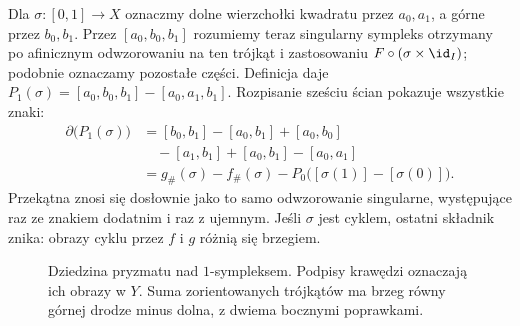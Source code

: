 \begin{przyklad}
\label{prz:pryzmat-drogi}
Dla $\sigma:[0,1]\to X$ oznaczmy dolne wierzchołki kwadratu
przez $a_0,a_1$, a górne przez $b_0,b_1$.
Przez $[a_0,b_0,b_1]$ rozumiemy teraz singularny sympleks
otrzymany po afinicznym odwzorowaniu na ten trójkąt i zastosowaniu
$F\circ(\sigma\times\id_I)$; podobnie oznaczamy pozostałe części.
Definicja daje $P_1(\sigma)=[a_0,b_0,b_1]-[a_0,a_1,b_1]$.
Rozpisanie sześciu ścian pokazuje wszystkie znaki:
\[
 \begin{aligned}
 \partial\bigl(P_1(\sigma)\bigr)
 &=[b_0,b_1]-[a_0,b_1]+[a_0,b_0]\\
 &\quad-[a_1,b_1]+[a_0,b_1]-[a_0,a_1]\\
 &=g_\#(\sigma)-f_\#(\sigma)
   -P_0\bigl([\sigma(1)]-[\sigma(0)]\bigr).
 \end{aligned}
\]
Przekątna znosi się dosłownie jako to samo odwzorowanie
singularne, występujące raz ze znakiem dodatnim i raz z ujemnym.
Jeśli $\sigma$ jest cyklem, ostatni składnik znika: obrazy
cyklu przez $f$ i $g$ różnią się brzegiem.
\end{przyklad}

\begin{figure}[!htbp]
\centering
{}
\caption{Dziedzina pryzmatu nad $1$-sympleksem. Podpisy krawędzi
oznaczają ich obrazy w $Y$. Suma zorientowanych trójkątów ma brzeg
równy górnej drodze minus dolna, z dwiema bocznymi poprawkami.}
\label{fig:pryzmat-homologia}
\end{figure}

